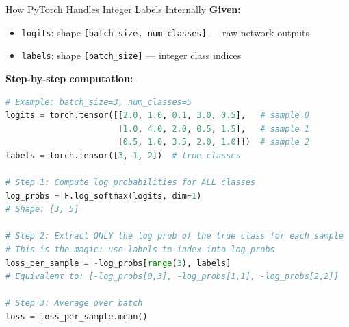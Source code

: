 \documentclass[xcolor=svgnames, 8pt, handout, standalone]{beamer}
\newcommand{\1}{\mathbf{1}}
\begin{document}
\begin{frame}[fragile]{How PyTorch Handles Integer Labels Internally}
\textbf{Given:}
\begin{itemize}
\item \texttt{logits}: shape \texttt{[batch\_size, num\_classes]} — raw network outputs
\item \texttt{labels}: shape \texttt{[batch\_size]} — integer class indices
\end{itemize}

\vspace{0.5em}
\textbf{Step-by-step computation:}

\begin{lstlisting}[language=Python]
# Example: batch_size=3, num_classes=5
logits = torch.tensor([[2.0, 1.0, 0.1, 3.0, 0.5],   # sample 0
                       [1.0, 4.0, 2.0, 0.5, 1.5],   # sample 1
                       [0.5, 1.0, 3.5, 2.0, 1.0]])  # sample 2
labels = torch.tensor([3, 1, 2])  # true classes

# Step 1: Compute log probabilities for ALL classes
log_probs = F.log_softmax(logits, dim=1)
# Shape: [3, 5]

# Step 2: Extract ONLY the log prob of the true class for each sample
# This is the magic: use labels to index into log_probs
loss_per_sample = -log_probs[range(3), labels]
# Equivalent to: [-log_probs[0,3], -log_probs[1,1], -log_probs[2,2]]

# Step 3: Average over batch
loss = loss_per_sample.mean()
\end{lstlisting}
\end{frame}
\end{document}
